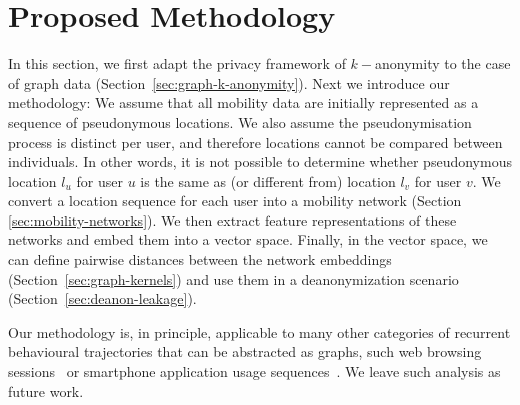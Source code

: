 
\section{Proposed Methodology\label{sec:methodology}}


 In this section, we first adapt the privacy framework of $k-$anonymity to the case of graph data (Section~\ref{sec:graph-k-anonymity}). Next we introduce our methodology: We assume that all mobility data are initially represented as a sequence of pseudonymous locations.
We also assume the pseudonymisation process is distinct per user, and therefore locations cannot be compared between individuals.
In other words, it is not possible to determine whether pseudonymous location $l_u$ for user $u$ is the same as (or different from) location $l_v$ for user $v$.
We convert a location sequence for each user into a mobility network (Section \ref{sec:mobility-networks}). %
We then extract feature representations of these networks and embed them into a vector space.
Finally, in the vector space, we can define pairwise distances between the network embeddings (Section~\ref{sec:graph-kernels}) and use them in a deanonymization scenario (Section~\ref{sec:deanon-leakage}).  %

Our methodology is, in principle, applicable to many other categories of recurrent behavioural trajectories that can be abstracted as graphs, such web browsing sessions~\cite{olejnik14, yen12} or smartphone application usage sequences~\cite{Welke2016}.
We leave such analysis as future work.

